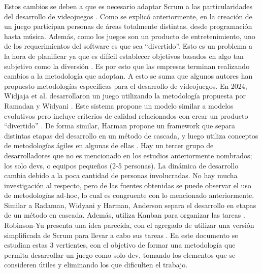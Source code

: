 Estos cambios se deben a que es necesario adaptar Scrum a las particularidades del desarrollo de videojuegos \cite{mckenzieAgileNotAgile2021,bartoszScrumVideoGames2023}.
Como se explicó anteriormente, en la creación de un juego participan personas de áreas totalmente distintas, desde programación hasta música. Además, como los juegos son un producto de entretenimiento, uno de los requerimientos del software es que sea “divertido”. Esto es un problema a la hora de planificar ya que es difícil establecer objetivos basados en algo tan subjetivo como la diversión \cite{mckenzieAgileNotAgile2021,bartoszScrumVideoGames2023}. Es por esto que las empresas terminan realizando cambios a la metodología que adoptan.
\bigbreak
A esto se suma que algunos autores han propuesto metodologías específicas para el desarrollo de videojuegos. En 2024, Widjaja et al. desarrollaron un juego utilizando la metodología propuesta por Ramadan y Widyani \cite{widjajaUtilizingGameDevelopment2024}. Este sistema propone un modelo similar a modelos evolutivos pero incluye criterios de calidad relacionados con crear un producto “divertido” \cite{ramadanGameDevelopmentLife2013}. De forma similar, Harman propone un framework que separa distintas etapas del desarrollo en un método de cascada, y luego utiliza conceptos de metodologías ágiles en algunas de ellas \cite{harmanDevelopmentMethodologiesGame2023}.
\bigbreak
Hay un tercer grupo de desarrolladores que no es mencionado en los estudios anteriormente nombrados; los solo devs, o equipos pequeños (2-5 personas). La dinámica de desarrollo cambia debido a la poca cantidad de personas involucradas. No hay mucha investigación al respecto, pero de las fuentes obtenidas se puede observar el uso de metodologías ad-hoc, lo cual es congruente con lo mencionado anteriormente. Similar a Radaman, Widyani y Harman, Anderson separa el desarrollo en etapas de un método en cascada. Además, utiliza Kanban para organizar las tareas \cite{andersonProductionPointHow2023}. Robinson-Yu presenta una idea parecida, con el agregado de utilizar una versión simplificada de Scrum para llevar a cabo sus tareas \cite{gamedevelopersconferenceCraftingTinyOpen2020}.
\bigbreak
En este documento se estudian estas 3 vertientes, con el objetivo de formar una metodología que permita desarrollar un juego como solo dev, tomando los elementos que se consideren útiles y eliminando los que dificulten el trabajo.




